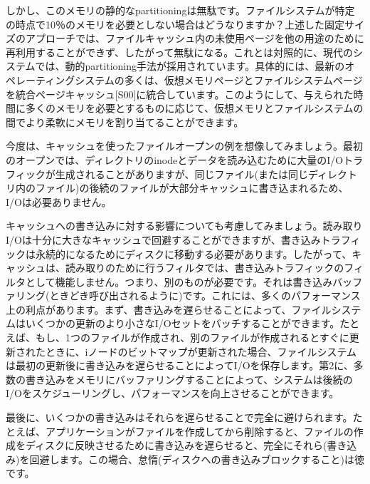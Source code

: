 しかし、このメモリの静的なpartitioningは無駄です。ファイルシステムが特定の時点で10％のメモリを必要としない場合はどうなりますか？上述した固定サイズのアプローチでは、ファイルキャッシュ内の未使用ページを他の用途のために再利用することができず、したがって無駄になる。これとは対照的に、現代のシステムでは、動的partitioning手法が採用されています。具体的には、最新のオペレーティングシステムの多くは、仮想メモリページとファイルシステムページを統合ページキャッシュ{[}S00{]}に統合しています。このようにして、与えられた時間に多くのメモリを必要とするものに応じて、仮想メモリとファイルシステムの間でより柔軟にメモリを割り当てることができます。

今度は、キャッシュを使ったファイルオープンの例を想像してみましょう。最初のオープンでは、ディレクトリのinodeとデータを読み込むために大量のI/Oトラフィックが生成されることがありますが、同じファイル(または同じディレクトリ内のファイル)の後続のファイルが大部分キャッシュに書き込まれるため、I/Oは必要ありません。

キャッシュへの書き込みに対する影響についても考慮してみましょう。読み取りI/Oは十分に大きなキャッシュで回避することができますが、書き込みトラフィックは永続的になるためにディスクに移動する必要があります。したがって、キャッシュは、読み取りのために行うフィルタでは、書き込みトラフィックのフィルタとして機能しません。つまり、別のものが必要です。それは書き込みバッファリング(ときどき呼び出されるように)です。これには、多くのパフォーマンス上の利点があります。まず、書き込みを遅らせることによって、ファイルシステムはいくつかの更新のより小さなI/Oセットをバッチすることができます。たとえば、もし、1つのファイルが作成され、別のファイルが作成されるとすぐに更新されたときに、iノードのビットマップが更新された場合、ファイルシステムは最初の更新後に書き込みを遅らせることによってI/Oを保存します。第2に、多数の書き込みをメモリにバッファリングすることによって、システムは後続のI/Oをスケジューリングし、パフォーマンスを向上させることができます。

最後に、いくつかの書き込みはそれらを遅らせることで完全に避けられます。たとえば、アプリケーションがファイルを作成してから削除すると、ファイルの作成をディスクに反映させるために書き込みを遅らせると、完全にそれら(書き込み)を回避します。この場合、怠惰(ディスクへの書き込みブロックすること)は徳です。

